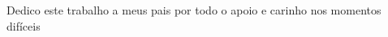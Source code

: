 \begin{dedicatoria}
\begin{center}

\vspace*{\fill} 
Dedico este trabalho a meus pais por todo o apoio e carinho nos momentos difíceis

\end{center}
\end{dedicatoria}
